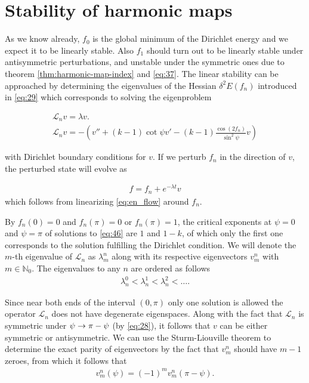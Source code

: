 \section{Stability of harmonic maps}
\label{sec:stab-ground-stat}

As we know already, $f_0$ is the global minimum of the Dirichlet
energy and we expect it to be linearly stable. Also $f_1$ should turn
out to be linearly stable under antisymmetric perturbations, and
unstable under the symmetric ones due to theorem
\ref{thm:harmonic-map-index} and \eqref{eq:37}. The linear stability
can be approached by determining the eigenvalues of the Hessian
$\delta^2E(f_n)$ introduced in \eqref{eq:29} which corresponds to
solving the eigenproblem

\begin{align}
  \label{eq:39}
  \mathcal{L}_n v = \lambda v. \\
  \label{eq:40}
  \mathcal{L}_n v = -\left(v''+(k-1)\cot\psi
    v'-(k-1)\frac{\cos(2f_n)}{\sin^2\psi}v\right)
\end{align}

with Dirichlet boundary conditions for $v$. If we perturb $f_n$ in the
direction of $v$, the perturbed state will evolve as

\begin{align}
  \label{eq:41}
  f=f_n+e^{-\lambda t}v
\end{align}
which follows from linearizing \eqref{eq:en_flow} around $f_n$.

By $f_n(0)=0$ and $f_n(\pi)=0$ or $f_n(\pi)=1$, the critical exponents
at $\psi=0$ and $\psi=\pi$ of solutions to \eqref{eq:46} are $1$ and
$1-k$, of which only the first one corresponds to the solution
fulfilling the Dirichlet condition. We will denote the $m$-th
eigenvalue of $\mathcal{L}_n$ as $\lambda_m^n$ along with its
respective eigenvectors $v_m^n$ with $m\in\mathbb{N}_0$. The
eigenvalues to any $n$ are ordered as follows
\begin{align}
  \label{eq:75}
  \lambda_n^0<\lambda_n^1<\lambda_n^2<\dots.
\end{align}

Since near both ends of the interval $(0,\pi)$ only one solution is
allowed the operator $\mathcal{L}_n$ does not have degenerate
eigenspaces. Along with the fact that $\mathcal{L}_n$ is symmetric
under $\psi\rightarrow\pi-\psi$ (by \eqref{eq:28}), it follows that $v$ can be
either symmetric or antisymmetric. We can use the Sturm-Liouville
theorem to determine the exact parity of eigenvectors by the fact that
$v_m^n$ should have $m-1$ zeroes, from which it follows that
\begin{align}
  \label{eq:44}
  v_m^n(\psi)=(-1)^m v_m^n(\pi-\psi).
\end{align}


